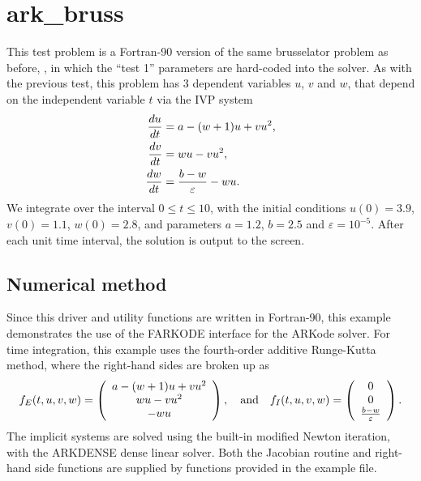 \documentclass[letterpaper,10pt,english]{sphinxmanual}
\begin{document}
\section{ark\_bruss}
\label{f90_serial:ark-bruss}\label{f90_serial:id1}
This test problem is a Fortran-90 version of the same brusselator
problem as before, {\hyperref[c_serial:ark-brusselator]{\emph{}}}, in which the ``test 1''
parameters are hard-coded into the solver.  As with the previous test,
this problem has 3 dependent variables \(u\), \(v\) and
\(w\), that depend on the independent variable \(t\) via the
IVP system
\begin{gather}
\begin{split}\frac{du}{dt} &= a - (w+1)u + v u^2, \\
\frac{dv}{dt} &= w u - v u^2, \\
\frac{dw}{dt} &= \frac{b-w}{\varepsilon} - w u.\end{split}\notag
\end{gather}
We integrate over the interval \(0 \le t \le 10\), with the
initial conditions \(u(0) = 3.9\), \(v(0) = 1.1\),
\(w(0) = 2.8\), and parameters \(a=1.2\), \(b=2.5\) and
\(\varepsilon=10^{-5}\).  After each unit time interval, the
solution is output to the screen.


\subsection{Numerical method}
\label{f90_serial:numerical-method}
Since this driver and utility functions are written in Fortran-90,
this example demonstrates the use of the FARKODE interface for the
ARKode solver.  For time integration, this example uses the
fourth-order additive Runge-Kutta method, where the right-hand sides
are broken up as
\begin{gather}
\begin{split}f_E(t,u,v,w) = \left(\begin{array}{c} a - (w+1)u + v u^2 \\
  w u - v u^2 \\ - w u  \end{array}\right), \quad\text{and}\quad
f_I(t,u,v,w) = \left(\begin{array}{c} 0\\0\\
  \frac{b-w}{\varepsilon}\end{array}\right).\end{split}\notag
\end{gather}
The implicit systems are solved using the built-in modified Newton
iteration, with the ARKDENSE dense linear solver.  Both the Jacobian
routine and right-hand side functions are supplied by functions
provided in the example file.
\end{document}

